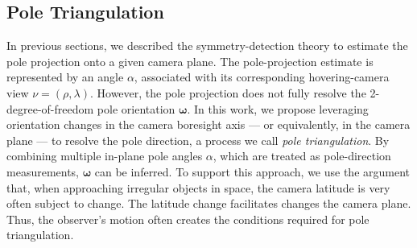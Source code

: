 

\subsection{Pole Triangulation}

In previous sections, we described the symmetry-detection theory to estimate the pole projection onto a given camera plane. The pole-projection estimate is represented by an angle $\alpha$, associated with its corresponding hovering-camera view $\nu=(\rho,\lambda)$. However, the pole projection does not fully resolve the 2-degree-of-freedom pole orientation $\boldsymbol{\omega}$. In this work, we propose leveraging orientation changes in the camera boresight axis --- or equivalently, in the camera plane --- to resolve the pole direction, a process we call \textit{pole triangulation}. By combining multiple in-plane pole angles $\alpha$, which are treated as pole-direction measurements, $\boldsymbol{\omega}$ can be inferred. To support this approach, we use the argument that, when approaching irregular objects in space, the camera latitude is very often subject to change. The latitude change facilitates changes the camera plane. Thus, the observer's motion often creates the conditions required for pole triangulation.

